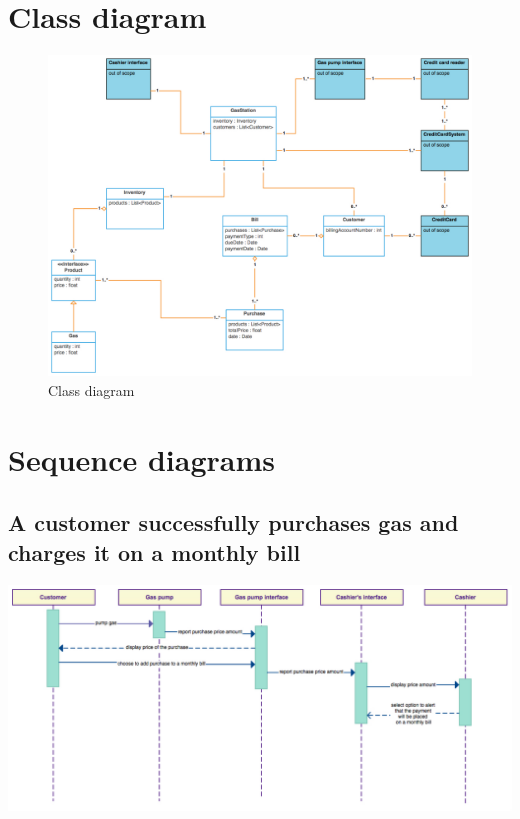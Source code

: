 \documentclass[11pt, a4paper]{article}
\begin{document}
\section{Class diagram}

\begin{figure}[h]
\centering
\includegraphics[width=\textwidth]{Class_diagram.pdf}
\caption{Class diagram}
\end{figure}


\section{Sequence diagrams}

\subsection{A customer successfully purchases gas and charges it on a monthly bill}

\begin{center}
\includegraphics[width=17cm, angle=90]{SequenceDiagram_1_monthly_bill.pdf}
\end{center}
\end{document}
